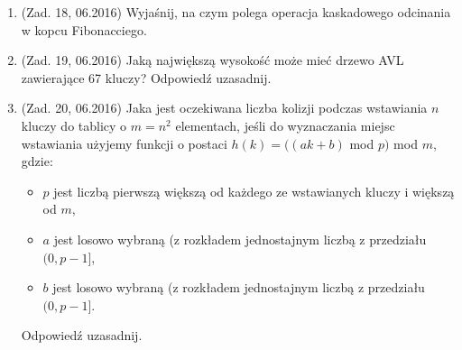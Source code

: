 \documentclass[10pt]{article}%
\begin{document}
\begin{enumerate}
\item (Zad. 18, 06.2016) Wyjaśnij, na czym polega operacja kaskadowego odcinania w kopcu Fibonacciego.
\item (Zad. 19, 06.2016) Jaką największą wysokość może mieć drzewo AVL zawierające 67 kluczy? Odpowiedź uzasadnij.
\item (Zad. 20, 06.2016) Jaka jest oczekiwana liczba kolizji podczas wstawiania $n$ kluczy do tablicy o $ m = n^2 $ elementach, jeśli do wyznaczania miejsc wstawiania użyjemy funkcji o postaci $h(k) = ((ak + b)$ mod $p)$ mod $m$, gdzie:
\begin{itemize}
\item $p$ jest liczbą pierwszą większą od każdego ze wstawianych kluczy i większą od $m$,
\item $a$ jest losowo wybraną (z rozkładem jednostajnym liczbą z przedziału $(0, p-1]$,
\item $b$ jest losowo wybraną (z rozkładem jednostajnym liczbą z przedziału $(0, p-1]$.
\end{itemize} 
Odpowiedź uzasadnij.


\end{enumerate}
\end{document}
